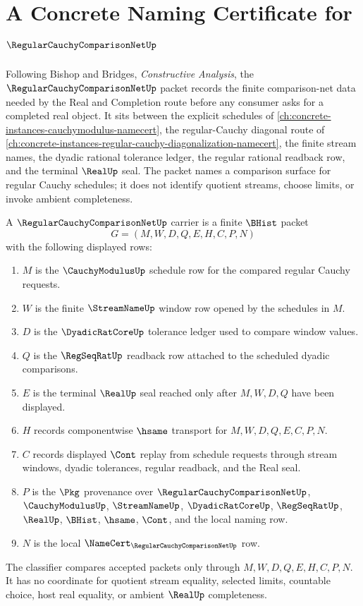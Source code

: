 \chapter{A Concrete Naming Certificate for $\RegularCauchyComparisonNetUp$}
\label{ch:concrete-instances-regular-cauchy-comparison-net-namecert}

Following Bishop and Bridges, \emph{Constructive Analysis}, the $\RegularCauchyComparisonNetUp$ packet records the finite comparison-net data needed by the Real and Completion route before any consumer asks for a completed real object. It sits between the explicit schedules of \autoref{ch:concrete-instances-cauchymodulus-namecert}, the regular-Cauchy diagonal route of \autoref{ch:concrete-instances-regular-cauchy-diagonalization-namecert}, the finite stream names, the dyadic rational tolerance ledger, the regular rational readback row, and the terminal $\RealUp$ seal. The packet names a comparison surface for regular Cauchy schedules; it does not identify quotient streams, choose limits, or invoke ambient completeness.

\begin{definition}
\label{def:regular-cauchy-comparison-net-carrier}
A $\RegularCauchyComparisonNetUp$ carrier is a finite $\BHist$ packet
$$
G=(M,W,D,Q,E,H,C,P,N)
$$
with the following displayed rows:
\begin{enumerate}
\item $M$ is the $\CauchyModulusUp$ schedule row for the compared regular Cauchy requests.
\item $W$ is the finite $\StreamNameUp$ window row opened by the schedules in $M$.
\item $D$ is the $\DyadicRatCoreUp$ tolerance ledger used to compare window values.
\item $Q$ is the $\RegSeqRatUp$ readback row attached to the scheduled dyadic comparisons.
\item $E$ is the terminal $\RealUp$ seal reached only after $M,W,D,Q$ have been displayed.
\item $H$ records componentwise $\hsame$ transport for $M,W,D,Q,E,C,P,N$.
\item $C$ records displayed $\Cont$ replay from schedule requests through stream windows, dyadic tolerances, regular readback, and the Real seal.
\item $P$ is the $\Pkg$ provenance over $\RegularCauchyComparisonNetUp$, $\CauchyModulusUp$, $\StreamNameUp$, $\DyadicRatCoreUp$, $\RegSeqRatUp$, $\RealUp$, $\BHist$, $\hsame$, $\Cont$, and the local naming row.
\item $N$ is the local $\NameCert_{\RegularCauchyComparisonNetUp}$ row.
\end{enumerate}
The classifier compares accepted packets only through $M,W,D,Q,E,H,C,P,N$. It has no coordinate for quotient stream equality, selected limits, countable choice, host real equality, or ambient $\RealUp$ completeness.
\end{definition}

